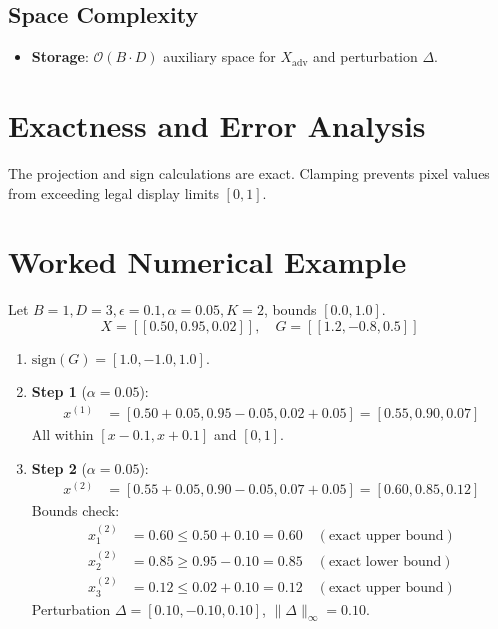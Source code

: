 \documentclass[11pt,a4paper]{article}
\theoremstyle{definition}
\begin{document}
\subsection{Space Complexity}
\begin{itemize}
    \item \textbf{Storage}: $\mathcal{O}(B \cdot D)$ auxiliary space for $X_{\text{adv}}$ and perturbation $\Delta$.
\end{itemize}

\section{Exactness and Error Analysis}

The projection and sign calculations are exact. Clamping prevents pixel values from exceeding legal display limits $[0, 1]$.

\section{Worked Numerical Example}

Let $B = 1, D = 3, \epsilon = 0.1, \alpha = 0.05, K = 2$, bounds $[0.0, 1.0]$.
\begin{equation}
X = [[0.50, 0.95, 0.02]], \quad G = [[1.2, -0.8, 0.5]]
\end{equation}

\begin{enumerate}
    \item $\text{sign}(G) = [1.0, -1.0, 1.0]$.
    \item \textbf{Step 1} ($\alpha = 0.05$):
    \begin{align}
    x^{(1)} &= [0.50 + 0.05, 0.95 - 0.05, 0.02 + 0.05] = [0.55, 0.90, 0.07]
    \end{align}
    All within $[x - 0.1, x + 0.1]$ and $[0, 1]$.
    \item \textbf{Step 2} ($\alpha = 0.05$):
    \begin{align}
    x^{(2)} &= [0.55 + 0.05, 0.90 - 0.05, 0.07 + 0.05] = [0.60, 0.85, 0.12]
    \end{align}
    Bounds check:
    \begin{align}
    x_1^{(2)} &= 0.60 \le 0.50 + 0.10 = 0.60 \quad (\text{exact upper bound}) \\
    x_2^{(2)} &= 0.85 \ge 0.95 - 0.10 = 0.85 \quad (\text{exact lower bound}) \\
    x_3^{(2)} &= 0.12 \le 0.02 + 0.10 = 0.12 \quad (\text{exact upper bound})
    \end{align}
    Perturbation $\Delta = [0.10, -0.10, 0.10]$, $\|\Delta\|_\infty = 0.10$.
\end{enumerate}
\end{document}
